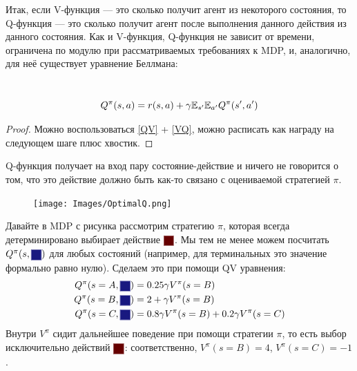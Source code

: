 Итак, если V-функция --- это сколько получит агент из некоторого состояния, то Q-функция --- это сколько получит агент после выполнения данного действия из данного состояния. Как и V-функция, Q-функция не зависит от времени, ограничена по модулю при рассматриваемых требованиях к MDP, и, аналогично, для неё существует уравнение Беллмана:

\begin{theorem}
\,
\begin{equation}\label{QQ}
    Q^\pi(s, a) =  r(s, a) + \gamma \mathbb{E}_{s'} \mathbb{E}_{a'} Q^\pi(s', a')
\end{equation}
\begin{proof}
Можно воспользоваться \eqref{QV} + \eqref{VQ}, можно расписать как награду на следующем шаге плюс хвостик.
\end{proof}
\end{theorem}

\begin{example}
Q-функция получает на вход пару состояние-действие и ничего не говорится о том, что это действие должно быть как-то связано с оцениваемой стратегией $\pi$. 

\begin{figure}
\vspace{-0.2cm}
\centering
\texttt{[image: Images/OptimalQ.png]}
\vspace{-1.3cm}
\end{figure}

Давайте в MDP с рисунка рассмотрим стратегию $\pi$, которая всегда детерминировано выбирает действие $\colorsquare{ChadRed}$. Мы тем не менее можем посчитать $Q^\pi(s, \colorsquare{ChadBlue})$ для любых состояний (например, для терминальных это значение формально равно нулю). Сделаем это при помощи QV уравнения:
\begin{align*} 
Q^\pi(s = A, \colorsquare{ChadBlue}) &= 0.25 \gamma V^\pi(s = B) \\ 
Q^\pi(s = B, \colorsquare{ChadBlue}) &= 2 + \gamma V^\pi(s = B) \\
Q^\pi(s = C, \colorsquare{ChadBlue}) &= 0.8 \gamma V^\pi(s = B) + 0.2 \gamma V^\pi(s = C)
\end{align*}
Внутри $V^\pi$ сидит дальнейшее поведение при помощи стратегии $\pi$, то есть выбор исключительно действий $\colorsquare{ChadRed}$: соответственно, $V^\pi(s = B) = 4$, $V^\pi(s = C) = -1$.
\end{example}

